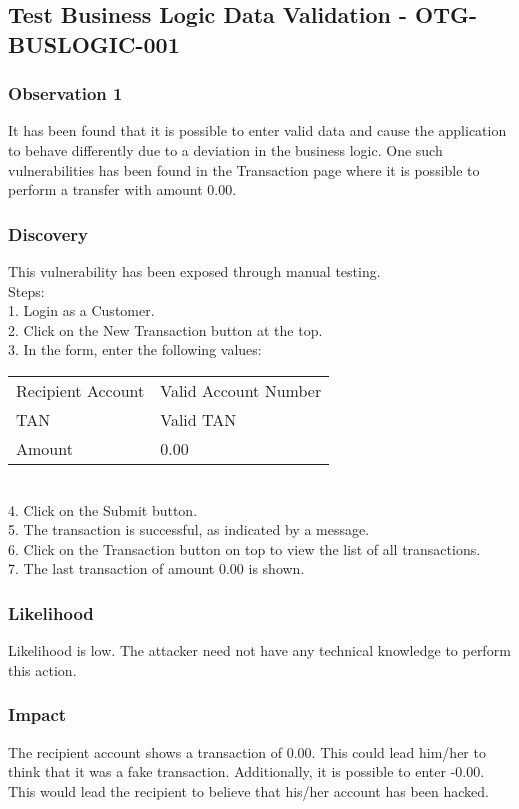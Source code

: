 \subsection{Test Business Logic Data Validation - OTG-BUSLOGIC-001}

\subsubsection{Observation 1}
It has been found that it is possible to enter valid data and cause the application to behave differently due to a deviation in the business logic. One such vulnerabilities has been found in the Transaction page where it is possible to perform a transfer with amount 0.00.

\subsubsection{Discovery}
This vulnerability has been exposed through manual testing.\\
Steps: \\
1. Login as a Customer. \\
2. Click on the New Transaction button at the top. \\
3. In the form, enter the following values: \\
\begin{tabular}{l | l}
Recipient Account 	& Valid Account Number\\
TAN			& Valid TAN \\
Amount		& 0.00
\end{tabular} \\
4. Click on the Submit button. \\
5. The transaction is successful, as indicated by a message. \\
6. Click on the Transaction button on top to view the list of all transactions. \\
7. The last transaction of amount 0.00 is shown.

\subsubsection{Likelihood}
Likelihood is low.
The attacker need not have any technical knowledge to perform this action.

\subsubsection{Impact}
The recipient account shows a transaction of 0.00. This could lead him/her to think that it was a fake transaction. Additionally, it is possible to enter -0.00. This would lead the recipient to believe that his/her account has been hacked.

